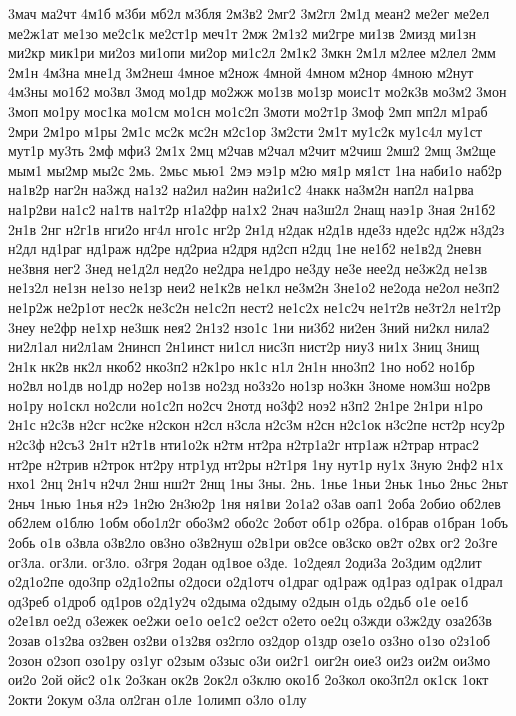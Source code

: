 3мач
ма2чт
4м1б
м3би
мб2л
м3бля
2м3в2
2мг2
3м2гл
2м1д
меан2
ме2ег
ме2ел
ме2ж1ат
ме1зо
ме2с1к
ме2ст1р
меч1т
2мж
2м1з2
ми2гре
ми1зв
2мизд
ми1зн
ми2кр
мик1ри
ми2оз
ми1опи
ми2ор
ми1с2л
2м1к2
3мкн
2м1л
м2лее
м2лел
2мм
2м1н
4м3на
мне1д
3м2неш
4мное
м2нож
4мной
4мном
м2нор
4мною
м2нут
4м3ны
мо1б2
мо3вл
3мод
мо1др
мо2жж
мо1зв
мо1зр
моис1т
мо2к3в
мо3м2
3мон
3моп
мо1ру
мос1ка
мо1см
мо1сн
мо1с2п
3моти
мо2т1р
3моф
2мп
мп2л
м1раб
2мри
2м1ро
м1ры
2м1с
мс2к
мс2н
м2с1ор
3м2сти
2м1т
му1с2к
му1с4л
му1ст
мут1р
му3ть
2мф
мфи3
2м1х
2мц
м2чав
м2чал
м2чит
м2чиш
2мш2
2мщ
3м2ще
мым1
мы2мр
мы2с
2мь.
2мьс
мью1
2мэ
мэ1р
м2ю
мя1р
мя1ст
1на
наби1о
наб2р
на1в2р
наг2н
на3жд
на1з2
на2ил
на2ин
на2и1с2
4накк
на3м2н
нап2л
на1рва
на1р2ви
на1с2
на1тв
на1т2р
н1а2фр
на1х2
2нач
на3ш2л
2нащ
наэ1р
3ная
2н1б2
2н1в
2нг
н2г1в
нги2о
нг4л
нго1с
нг2р
2н1д
н2дак
н2д1в
нде3з
нде2с
нд2ж
н3д2з
н2дл
нд1раг
нд1раж
нд2ре
нд2риа
н2дря
нд2сп
н2дц
1не
не1б2
не1в2д
2невн
не3вня
нег2
3нед
не1д2л
нед2о
не2дра
не1дро
не3ду
не3е
нее2д
не3ж2д
не1зв
не1з2л
не1зн
не1зо
не1зр
неи2
не1к2в
не1кл
не3м2н
3не1о2
не2ода
не2ол
не3п2
не1р2ж
не2р1от
нес2к
не3с2н
не1с2п
нест2
не1с2х
не1с2ч
не1т2в
не3т2л
не1т2р
3неу
не2фр
не1хр
не3шк
нея2
2н1з2
нзо1с
1ни
ни3б2
ни2ен
3ний
ни2кл
нила2
ни2л1ал
ни2л1ам
2нинсп
2н1инст
ни1сл
нис3п
нист2р
ниу3
ни1х
3ниц
3нищ
2н1к
нк2в
нк2л
нкоб2
нко3п2
н2к1ро
нк1с
н1л
2н1н
нно3п2
1но
ноб2
но1бр
но2вл
но1дв
но1др
но2ер
но1зв
но2зд
но3з2о
но1зр
но3кн
3номе
ном3ш
но2рв
но1ру
но1скл
но2сли
но1с2п
но2сч
2нотд
но3ф2
ноэ2
н3п2
2н1ре
2н1ри
н1ро
2н1с
н2с3в
н2сг
нс2ке
н2скон
н2сл
н3сла
н2с3м
н2сн
н2с1ок
н3с2пе
нст2р
нсу2р
н2с3ф
н2съ3
2н1т
н2т1в
нти1о2к
н2тм
нт2ра
н2тр1а2г
нтр1аж
н2трар
нтрас2
нт2ре
н2трив
н2трок
нт2ру
нтр1уд
нт2ры
н2т1ря
1ну
нут1р
ну1х
3ную
2нф2
н1х
нхо1
2нц
2н1ч
н2чл
2нш
нш2т
2нщ
1ны
3ны.
2нь.
1нье
1ньи
2ньк
1ньо
2ньс
2ньт
2ньч
1нью
1нья
н2э
1н2ю
2н3ю2р
1ня
ня1ви
2о1а2
о3ав
оап1
2оба
2обио
об2лев
об2лем
о1блю
1обм
обо1л2г
обо3м2
обо2с
2обот
об1р
о2бра.
о1брав
о1бран
1объ
2обь
о1в
о3вла
о3в2ло
ов3но
о3в2нуш
о2в1ри
ов2се
ов3ско
ов2т
о2вх
ог2
2о3ге
ог3ла.
ог3ли.
ог3ло.
о3гря
2одан
од1вое
о3де.
1о2деял
2оди3а
2о3дим
од2лит
о2д1о2пе
одо3пр
о2д1о2пы
о2доси
о2д1отч
о1драг
од1раж
од1раз
од1рак
о1драл
од3реб
о1дроб
од1ров
о2д1у2ч
о2дыма
о2дыму
о2дын
о1дь
о2дьб
о1е
ое1б
о2е1вл
ое2д
о3ежек
ое2жи
ое1о
ое1с2
ое2ст
о2ето
ое2ц
о3жди
о3ж2ду
оза2б3в
2озав
о1з2ва
оз2вен
оз2ви
о1з2вя
оз2гло
оз2дор
о1здр
озе1о
оз3но
о1зо
о2з1об
2озон
о2зоп
озо1ру
оз1уг
о2зым
о3зыс
о3и
ои2г1
оиг2н
оие3
ои2з
ои2м
ои3мо
ои2о
2ой
ойс2
о1к
2о3кан
ок2в
2ок2л
о3клю
око1б
2о3кол
око3п2л
ок1ск
1окт
2окти
2окум
о3ла
ол2ган
о1ле
1олимп
о3ло
о1лу
